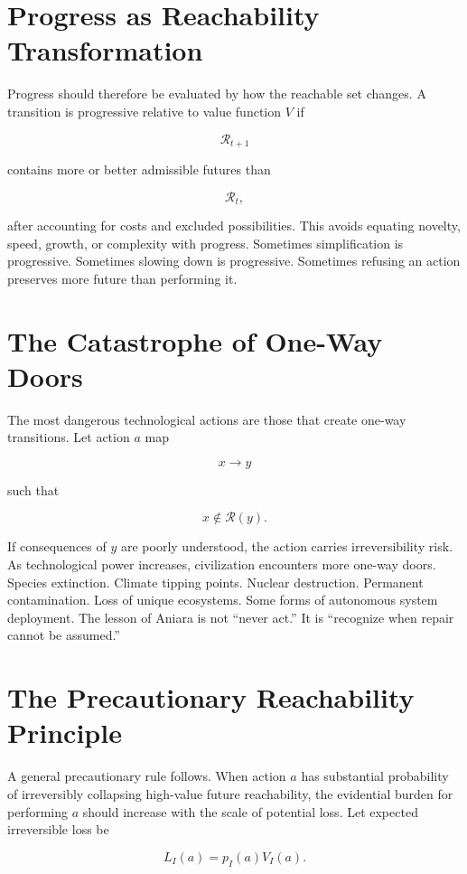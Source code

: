 \documentclass[11pt,oneside]{book}
\theoremstyle{definition}
\theoremstyle{remark}
\newcommand{\R}{\mathcal{R}}
\begin{document}
\section{Progress as Reachability Transformation}

Progress should therefore be evaluated by how the reachable set changes. A transition is progressive
relative to value function \(V\) if

\[
\R_{t+1}
\]

contains more or better admissible futures than

\[
\R_t,
\]

after accounting for costs and excluded possibilities. This avoids equating novelty, speed, growth,
or complexity with progress. Sometimes simplification is progressive. Sometimes slowing down is
progressive. Sometimes refusing an action preserves more future than performing it.

\section{The Catastrophe of One-Way Doors}

The most dangerous technological actions are those that create one-way transitions. Let action \(a\)
map

\[
x\rightarrow y
\]

such that

\[
x\notin\R(y).
\]

If consequences of \(y\) are poorly understood, the action carries irreversibility risk. As
technological power increases, civilization encounters more one-way doors. Species extinction.
Climate tipping points. Nuclear destruction. Permanent contamination. Loss of unique ecosystems.
Some forms of autonomous system deployment. The lesson of Aniara is not ``never act.'' It is
``recognize when repair cannot be assumed.''

\section{The Precautionary Reachability Principle}

A general precautionary rule follows. When action \(a\) has substantial probability of irreversibly
collapsing high-value future reachability, the evidential burden for performing \(a\) should
increase with the scale of potential loss. Let expected irreversible loss be

\[
L_I(a) = p_I(a)V_I(a).
\]
\end{document}
